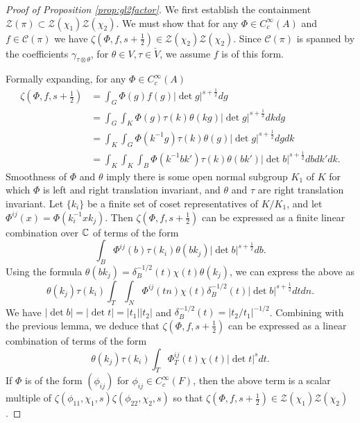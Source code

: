 \begin{proof}[Proof of Proposition \ref{prop:gl2factor}]
    We first establish the containment $\mathcal Z(\pi) \subset \mathcal Z(\chi_1)\mathcal Z(\chi_2)$. We must show that for any $\Phi \in C_c^\infty(A)$ and $f \in \mathcal C(\pi)$ we have $\zeta(\Phi,f,s+\frac{1}{2}) \in \mathcal Z(\chi_2)\mathcal Z(\chi_2)$. Since $\mathcal C(\pi)$ is spanned by the coefficients $\gamma_{\tau \otimes \theta}$, for $\theta \in V, \tau \in \check{V}$, we assume $f$ is of this form.

    Formally expanding, for any $\Phi \in C_c^\infty(A)$
    \begin{equation*}
        \begin{split}
            \zeta(\Phi,f,s+\frac{1}{2}) &= \int_G \Phi(g)f(g) |\det g|^{s+\frac{1}{2}} dg \\
            &= \int_G \int_K \Phi(g) \tau(k) \theta(kg)|\det g|^{s+\frac{1}{2}} dk dg \\
            &= \int_K \int_G \Phi(k^{-1}g) \tau(k)\theta(g) |\det g|^{s+\frac{1}{2}} dg dk \\
            &= \int_K \int_K \int_B \Phi(k^{-1}bk') \tau(k)\theta(bk') |\det b|^{s+\frac{1}{2}} db dk' dk.
        \end{split}
    \end{equation*}
    Smoothness of $\Phi$ and $\theta$ imply there is some open normal subgroup $K_1$ of $K$ for which $\Phi$ is left and right translation invariant, and $\theta$ and $\tau$ are right translation invariant. Let $\{k_i\}$ be a finite set of coset representatives of $K/K_1$, and let $\Phi^{ij}(x) = \Phi(k_i^{-1}xk_j)$. Then $\zeta(\Phi,f,s+\frac{1}{2})$ can be expressed as a finite linear combination over $\mathbb{C}$ of terms of the form 
    $$\int_B \Phi^{ij}(b) \tau(k_i)\theta(bk_j) |\det b|^{s+\frac{1}{2}} db.$$
    Using the formula $\theta(bk_j) = \delta_B^{-1/2}(t)\chi(t)\theta(k_j)$, we can express the above as
    $$\theta(k_j)\tau(k_i) \int_T\int_N \Phi^{ij}(tn) \chi(t)\delta_B^{-1/2}(t) |\det b|^{s+\frac{1}{2}} dt dn.$$
    We have $|\det b|=|\det t| = |t_1| |t_2|$ and $\delta_B^{-1/2}(t) = |t_2/t_1|^{-1/2}$. Combining with the previous lemma, we deduce that $\zeta(\Phi,f,s+\frac{1}{2})$ can be expressed as a linear combination of terms of the form 
    $$\theta(k_j)\tau(k_i) \int_T \Phi_T^{ij}(t) \chi(t) |\det t|^s dt.$$
    If $\Phi$ is of the form $(\phi_{ij})$ for $\phi_{ij} \in C_c^\infty(F)$, then the above term is a scalar multiple of $\zeta(\phi_{11},\chi_1,s)\zeta(\phi_{22},\chi_2,s)$ so that $\zeta(\Phi,f,s+\frac{1}{2}) \in \mathcal Z(\chi_1)\mathcal Z(\chi_2)$.


\end{proof}
